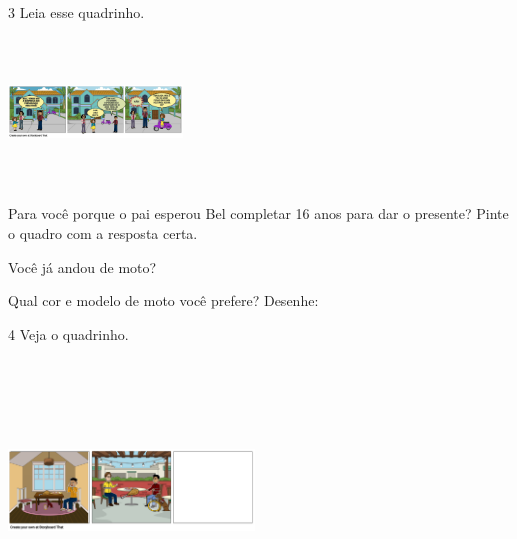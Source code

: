 \num{3} Leia esse quadrinho.


\includegraphics[width=1.82014in,height=1.55486in]{media/image130.png}


\begin{escolha}
\item Para você porque o pai esperou Bel completar 16 anos para dar o
presente? Pinte o quadro com a resposta certa.


\item Você já andou de moto?


\item Qual cor e modelo de moto você prefere? Desenhe:

\begin{mdframed}[linewidth=2pt,linecolor=salmao,roundcorner=10pt]
\vspace{5cm}
\end{mdframed}
\end{escolha}

\num{4} Veja o quadrinho.

\includegraphics[width=2.57222in,height=2.73403in]{media/image131.png}

